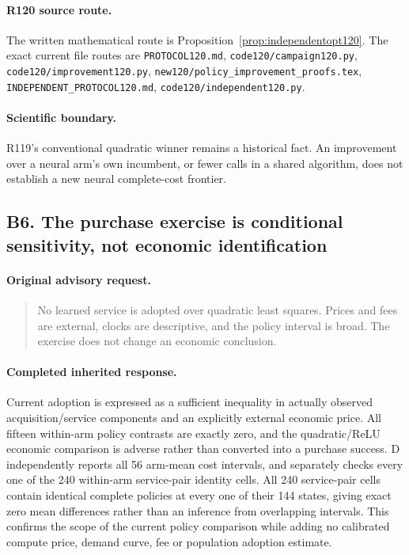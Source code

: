 \paragraph{R120 source route.}
The written mathematical route is Proposition~\ref{prop:independentopt120}. The exact current file routes are \nolinkurl{PROTOCOL120.md}, \nolinkurl{code120/campaign120.py}, \nolinkurl{code120/improvement120.py}, \nolinkurl{new120/policy_improvement_proofs.tex}, \nolinkurl{INDEPENDENT_PROTOCOL120.md}, \nolinkurl{code120/independent120.py}.
\paragraph{Scientific boundary.}
R119's conventional quadratic winner remains a historical fact. An improvement over a neural arm's own incumbent, or fewer calls in a shared algorithm, does not establish a new neural complete-cost frontier.

\subsection{B6. The purchase exercise is conditional sensitivity, not economic identification}
\label{response120:B6}
\paragraph{Original advisory request.}
\begin{quote}
No learned service is adopted over quadratic least squares. Prices and fees are external, clocks are descriptive, and the policy interval is broad. The exercise does not change an economic conclusion.
\end{quote}
\paragraph{Completed inherited response.}
Current adoption is expressed as a sufficient inequality in actually observed acquisition/service components and an explicitly external economic price. All fifteen within-arm policy contrasts are exactly zero, and the quadratic/ReLU economic comparison is adverse rather than converted into a purchase success. D independently reports all 56 arm-mean cost intervals, and separately checks every one of the 240 within-arm service-pair identity cells. All 240 service-pair cells contain identical complete policies at every one of their 144 states, giving exact zero mean differences rather than an inference from overlapping intervals. This confirms the scope of the current policy comparison while adding no calibrated compute price, demand curve, fee or population adoption estimate.
